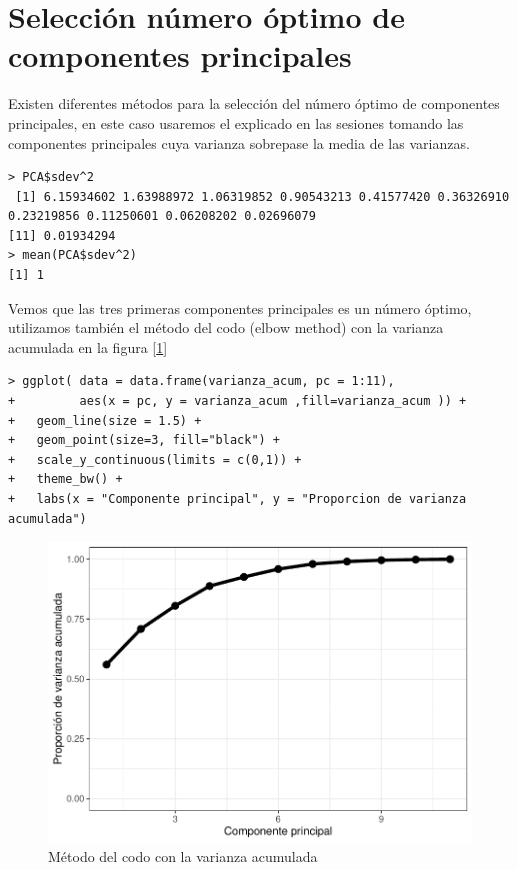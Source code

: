 \documentclass[12pt,twoside]{report}
\begin{document}
\section*{Selección número óptimo de componentes principales}
Existen diferentes métodos para la selección del número óptimo de componentes principales, en este caso usaremos el explicado en las sesiones tomando las componentes principales cuya varianza sobrepase la media de las varianzas.

\begin{lstlisting}
> PCA$sdev^2
 [1] 6.15934602 1.63988972 1.06319852 0.90543213 0.41577420 0.36326910 0.23219856 0.11250601 0.06208202 0.02696079
[11] 0.01934294
> mean(PCA$sdev^2)
[1] 1
\end{lstlisting}

Vemos que las tres primeras componentes principales es un número óptimo, utilizamos también el método del codo (elbow method) con la varianza acumulada en la figura [\ref{fig:elbow}]

\begin{lstlisting}
> ggplot( data = data.frame(varianza_acum, pc = 1:11),
+         aes(x = pc, y = varianza_acum ,fill=varianza_acum )) + 
+   geom_line(size = 1.5) + 
+   geom_point(size=3, fill="black") +
+   scale_y_continuous(limits = c(0,1)) + 
+   theme_bw() +
+   labs(x = "Componente principal", y = "Proporcion de varianza acumulada")
\end{lstlisting}

\begin{figure}[H]
\includegraphics[width=\textwidth]{../code/figures/elbow_method.pdf}
\caption{Método del codo con la varianza acumulada}
\label{fig:elbow}
\end{figure} 
\end{document}
